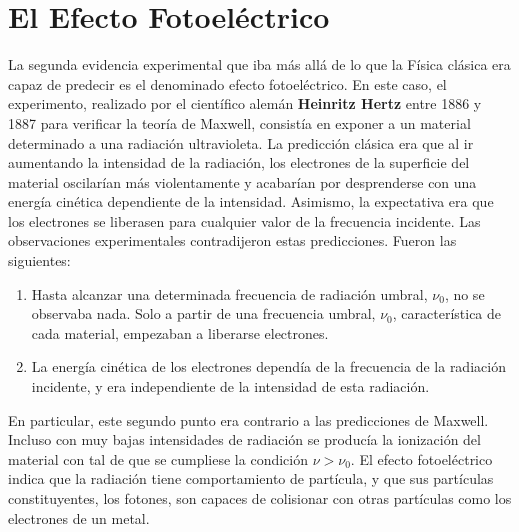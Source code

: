 \documentclass{tufte-handout}
\begin{document}
\section{El Efecto Fotoeléctrico}
La segunda evidencia experimental que iba más allá de lo que la 
Física clásica era capaz de predecir es el denominado efecto
fotoeléctrico. 
En este caso, el experimento, realizado por el científico
alemán \textbf{Heinritz Hertz} entre 1886 y 1887 para
verificar la teoría de Maxwell, consistía en 
exponer a un material determinado a una radiación ultravioleta.
La predicción clásica era que al ir aumentando la intensidad
de la radiación, los electrones de la superficie del material
oscilarían más violentamente y acabarían por desprenderse
con una energía cinética dependiente de la intensidad.
Asimismo, la expectativa era que los electrones se liberasen
para cualquier valor de la frecuencia incidente.
Las observaciones experimentales contradijeron estas predicciones.
Fueron las siguientes:
\begin{enumerate}
    \item Hasta alcanzar una determinada frecuencia de radiación
    umbral, $\nu_0$, no se observaba nada. Solo a
    partir de una frecuencia umbral, $\nu_0$, característica
    de cada material, empezaban a liberarse electrones.
    \item La energía cinética de los electrones dependía de la frecuencia de la radiación incidente, y era independiente de
    la intensidad de esta radiación.
\end{enumerate}
En particular, este segundo punto era contrario a las predicciones de
Maxwell. Incluso con muy bajas intensidades de radiación
se producía la ionización del material con tal de que se cumpliese
la condici\'on $\nu>\nu_0$.
El efecto fotoeléctrico indica que la radiación
tiene comportamiento de partícula, y que sus partículas 
constituyentes, los fotones, son capaces de colisionar
con otras partículas como los electrones de un metal. 
\end{document}
